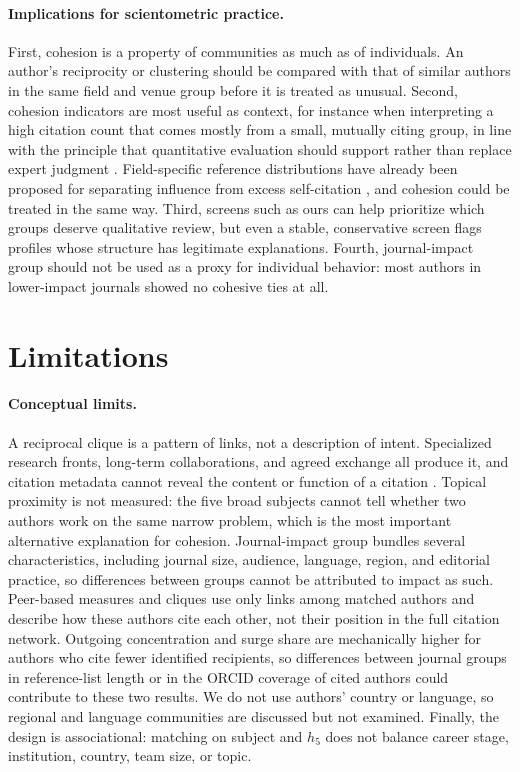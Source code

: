 \documentclass[12pt]{article}
\begin{document}
\paragraph{Implications for scientometric practice.}  First, cohesion is a property of communities as much as of individuals.  An author's reciprocity or clustering should be compared with that of similar authors in the same field and venue group before it is treated as unusual.  Second, cohesion indicators are most useful as context, for instance when interpreting a high citation count that comes mostly from a small, mutually citing group, in line with the principle that quantitative evaluation should support rather than replace expert judgment \parencite{Hicks2015,Wilsdon2015}.  Field-specific reference distributions have already been proposed for separating influence from excess self-citation \parencite{Szomszor2020}, and cohesion could be treated in the same way.  Third, screens such as ours can help prioritize which groups deserve qualitative review, but even a stable, conservative screen flags profiles whose structure has legitimate explanations.  Fourth, journal-impact group should not be used as a proxy for individual behavior: most authors in lower-impact journals showed no cohesive ties at all.

\section{Limitations}
\label{sec:limitations}

\paragraph{Conceptual limits.}  A reciprocal clique is a pattern of links, not a description of intent.  Specialized research fronts, long-term collaborations, and agreed exchange all produce it, and citation metadata cannot reveal the content or function of a citation \parencite{Liu2024}.  Topical proximity is not measured: the five broad subjects cannot tell whether two authors work on the same narrow problem, which is the most important alternative explanation for cohesion.  Journal-impact group bundles several characteristics, including journal size, audience, language, region, and editorial practice, so differences between groups cannot be attributed to impact as such.  Peer-based measures and cliques use only links among matched authors and describe how these authors cite each other, not their position in the full citation network.  Outgoing concentration and surge share are mechanically higher for authors who cite fewer identified recipients, so differences between journal groups in reference-list length or in the ORCID coverage of cited authors could contribute to these two results.  We do not use authors' country or language, so regional and language communities are discussed but not examined.  Finally, the design is associational: matching on subject and $h_5$ does not balance career stage, institution, country, team size, or topic.
\end{document}
